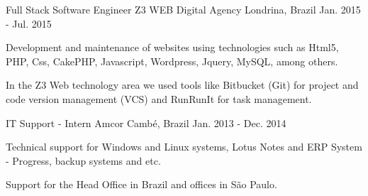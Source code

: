 \begin{cventries}
  \cventry
    {Full Stack Software Engineer} %
    {Z3 WEB Digital Agency} %
    {Londrina, Brazil} %
    {Jan. 2015 - Jul. 2015} %
    {
      \begin{cvitems} %
        \item {Development and maintenance of websites using technologies such as Html5, PHP, Css, CakePHP, Javascript, Wordpress, Jquery, MySQL, among others.}
\item {In the Z3 Web technology area we used tools like Bitbucket (Git) for project and code version management (VCS) and RunRunIt for task management.}
      \end{cvitems}
    }

  \cventry
    {IT Support - Intern} %
    {Amcor} %
    {Cambé, Brazil} %
    {Jan. 2013 - Dec. 2014} %
    {
      \begin{cvitems} %
        \item {Technical support for Windows and Linux systems, Lotus Notes and ERP System - Progress, backup systems and etc.}
        \item {Support for the Head Office in Brazil and offices in São Paulo.}
      \end{cvitems}
    }

\end{cventries}


